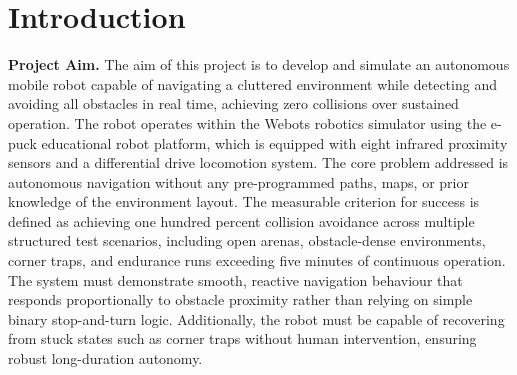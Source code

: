 \documentclass[12pt, a4paper]{article}
\begin{document}
\section{Introduction}

\textbf{Project Aim.} The aim of this project is to develop and simulate an autonomous mobile robot capable of navigating a cluttered environment while detecting and avoiding all obstacles in real time, achieving zero collisions over sustained operation. The robot operates within the Webots robotics simulator using the e-puck educational robot platform, which is equipped with eight infrared proximity sensors and a differential drive locomotion system. The core problem addressed is autonomous navigation without any pre-programmed paths, maps, or prior knowledge of the environment layout. The measurable criterion for success is defined as achieving one hundred percent collision avoidance across multiple structured test scenarios, including open arenas, obstacle-dense environments, corner traps, and endurance runs exceeding five minutes of continuous operation. The system must demonstrate smooth, reactive navigation behaviour that responds proportionally to obstacle proximity rather than relying on simple binary stop-and-turn logic. Additionally, the robot must be capable of recovering from stuck states such as corner traps without human intervention, ensuring robust long-duration autonomy.

\vspace{0.6cm}
\end{document}
